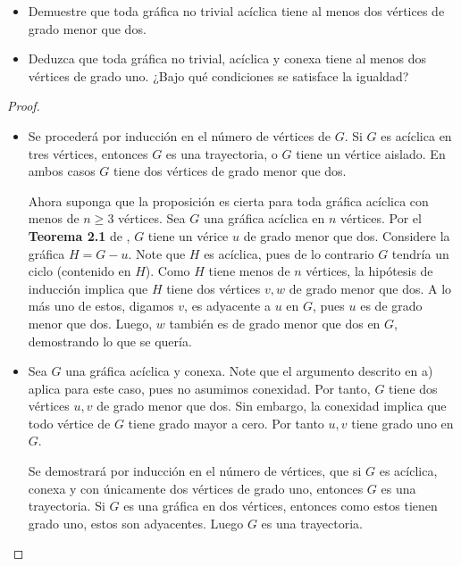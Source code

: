 \documentclass[12pt]{article}
\newenvironment{problem}[2][Problema]{\begin{trivlist}
\item[\hskip \labelsep {\bfseries #1}\hskip \labelsep {\bfseries #2.}]}{\end{trivlist}}
\begin{document}
\newpage
\begin{problem}{2.1.2} \text{ }
\begin{itemize}
    \item[a)] Demuestre que toda gráfica no trivial acíclica tiene al menos dos vértices de grado menor que dos.
    \item[b)] Deduzca que toda gráfica no trivial, acíclica y conexa tiene al menos dos vértices de grado uno. ¿Bajo qué condiciones se satisface la igualdad?
\end{itemize}
\end{problem}
\begin{proof}
\text{}
\begin{itemize}
    \item[a)] Se procederá por inducción en el número de vértices de $G.$ Si $G$ es acíclica en tres vértices, entonces $G$ es una trayectoria, o $G$ tiene un vértice aislado. En ambos casos $G$ tiene dos vértices de grado menor que dos. 
    
    Ahora suponga que la proposición es cierta para toda gráfica acíclica con menos de $n \geq 3$ vértices. Sea $G$ una gráfica acíclica en $n$ vértices. Por el \textbf{Teorema 2.1} de \cite{10.5555/1481153}, $G$ tiene un vérice $u$ de grado menor que dos. Considere la gráfica $H = G - u$. Note que $H$ es acíclica, pues de lo contrario $G$ tendría un ciclo (contenido en $H$). Como $H$ tiene menos de $n$ vértices, la hipótesis de inducción implica que $H$ tiene dos vértices $v, w$ de grado menor que dos. A lo más uno de estos, digamos $v$, es adyacente a $u$ en $G$, pues $u$ es de grado menor que dos. Luego, $w$ también es de grado menor que dos en $G$, demostrando lo que se quería.
    
    
    \item[b)] Sea $G$ una gráfica acíclica y conexa. Note que el argumento descrito en a) aplica para este caso, pues no asumimos conexidad. Por tanto, $G$ tiene dos vértices $u,v$  de grado menor que dos. Sin embargo, la conexidad implica que todo vértice de $G$ tiene grado mayor a cero. Por tanto $u,v$ tiene grado uno en $G.$
    
    
    Se demostrará por inducción en el número de vértices, que si $G$ es acíclica, conexa y con únicamente dos vértices de grado uno, entonces $G$ es una trayectoria. Si $G$ es una gráfica en dos vértices, entonces como estos tienen grado uno, estos son adyacentes. Luego $G$ es una trayectoria. 
    

\end{itemize}
\end{proof}
\end{document}
